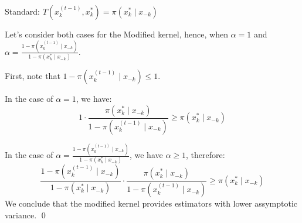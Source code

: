 \documentclass[12pt,letterpaper]{article}
\begin{document}
\begin{enumerate}[leftmargin=!,labelindent=5pt]
Standard: $T(x_k^{(t-1)}, x_k^*) = \pi(x_k^* \mid x_{-k})$

Let's consider both cases for the Modified kernel, hence, when
$\alpha = 1$ and
$\alpha =
\frac{1- \pi(x_k^{(t-1)} \mid x_{-k})}{1 -  \pi(x_k^* \mid x_{-k})} $.

First, note that $1- \pi(x_k^{(t-1)} \mid x_{-k})\leq 1$.

In the case of $\alpha = 1$, we have:
$$
1 \cdot\frac{\pi(x_k^* \mid x_{-k})}{1- \pi(x_k^{(t-1)} \mid x_{-k})}
\geq
\pi(x_k^* \mid x_{-k})
$$

In the case of $\alpha = 
\frac{1- \pi(x_k^{(t-1)} \mid x_{-k})}{1 -  \pi(x_k^* \mid x_{-k})} $,
we have $\alpha \geq 1$, therefore:
$$
\frac{1- \pi(x_k^{(t-1)} \mid x_{-k})}{1 -  \pi(x_k^* \mid x_{-k})}
\cdot\frac{\pi(x_k^* \mid x_{-k})}{1- \pi(x_k^{(t-1)} \mid x_{-k})}
\geq
\pi(x_k^* \mid x_{-k})
$$
We conclude that the modified kernel provides estimators
with lower assymptotic variance.
\qed
\end{enumerate}

\newpage
\end{document}
